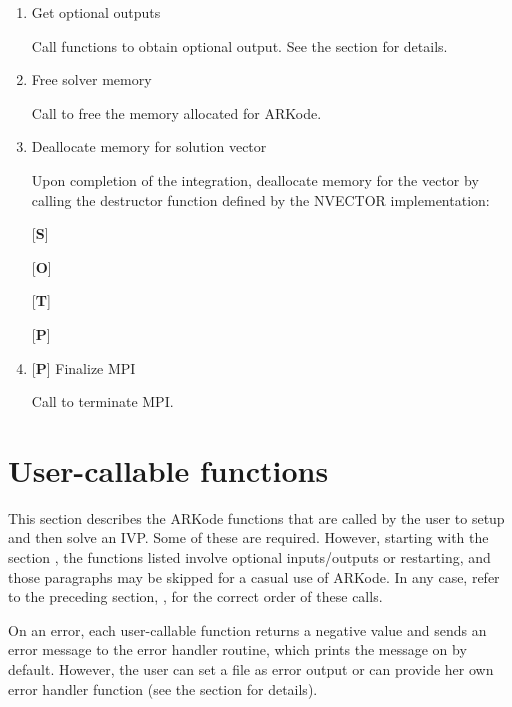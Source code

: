\documentclass[letterpaper,10pt,english]{sphinxmanual}
\begin{document}
\begin{enumerate}
\item {} 
Get optional outputs

Call  functions to obtain optional output. See
the section {\hyperref[c_interface/User_callable:cinterface-optionaloutputs]{\emph{}}} for details.

\item {} 
Free solver memory

Call  to free the memory allocated for ARKode.

\item {} 
Deallocate memory for solution vector

Upon completion of the integration, deallocate memory for the
vector  by calling the destructor function defined by the
NVECTOR implementation:

{[}\textbf{S}{]} 

{[}\textbf{O}{]} 

{[}\textbf{T}{]} 

{[}\textbf{P}{]} 

\item {} 
{[}\textbf{P}{]} Finalize MPI

Call  to terminate MPI.

\end{enumerate}


\section{User-callable functions}
\label{c_interface/User_callable::doc}\label{c_interface/User_callable:user-callable-functions}\label{c_interface/User_callable:cinterface-usercallable}
This section describes the ARKode functions that are called by the
user to setup and then solve an IVP. Some of these are
required. However, starting with the section
{\hyperref[c_interface/User_callable:cinterface-optionalinputs]{\emph{}}}, the functions listed involve
optional inputs/outputs or restarting, and those paragraphs may be
skipped for a casual use of ARKode. In any
case, refer to the preceding section, {\hyperref[c_interface/Skeleton:cinterface-skeleton]{\emph{}}}, for
the correct order of these calls.

On an error, each user-callable function returns a negative value and
sends an error message to the error handler routine, which prints the
message on  by default. However, the user can set a file as
error output or can provide her own error handler function
(see the section {\hyperref[c_interface/User_callable:cinterface-optionalinputs]{\emph{}}} for details).
\end{document}
